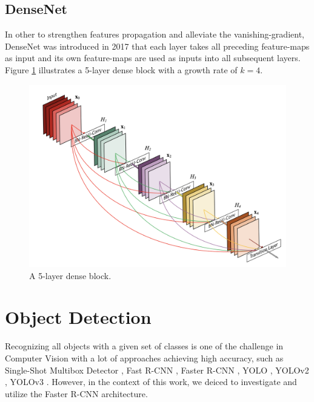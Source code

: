 \subsection{DenseNet}
In other to strengthen features propagation and alleviate the vanishing-gradient, DenseNet \cite{DenseNet} was introduced in 2017 that each layer takes all preceding feature-maps as input and its own feature-maps are used as inputs into all subsequent layers. Figure \ref{fig:dense_net} illustrates a 5-layer dense block with a growth rate of $k = 4$.
\begin{figure}[thb]
    \centering
    \includegraphics[width=\textwidth]{endoscopy_resources/densenet.png}
    \caption{A 5-layer dense block. \cite{DenseNet}}
    \label{fig:dense_net}
\end{figure}

\section{Object Detection}
Recognizing all objects with a given set of classes is one of the challenge in Computer Vision with a lot of approaches achieving high accuracy, such as Single-Shot Multibox Detector \cite{SSD}, Fast R-CNN \cite{FastRCNN}, Faster R-CNN \cite{FasterRCNN}, YOLO \cite{YOLO}, YOLOv2 \cite{YOLOv2}, YOLOv3 \cite{YOLOv3}. However, in the context of this work, we deiced to investigate and utilize the Faster R-CNN architecture.
